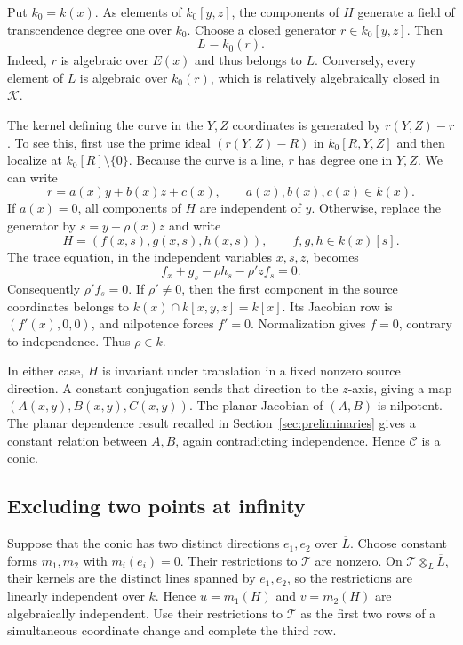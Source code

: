 \documentclass[11pt,reqno]{amsart}
\theoremstyle{definition}
\theoremstyle{remark}
\numberwithin{equation}{section}
\begin{document}
Put $k_0=k(x)$. As elements of $k_0[y,z]$, the components of $H$ generate a field of transcendence degree one over $k_0$. Choose a closed generator $r\in k_0[y,z]$. Then
\begin{equation}\label{eq:line-field}
 L=k_0(r).
\end{equation}
Indeed, $r$ is algebraic over $E(x)$ and thus belongs to $L$. Conversely, every element of $L$ is algebraic over $k_0(r)$, which is relatively algebraically closed in $\mathcal K$.

The kernel defining the curve in the $Y,Z$ coordinates is generated by $r(Y,Z)-r$. To see this, first use the prime ideal $(r(Y,Z)-R)$ in $k_0[R,Y,Z]$ and then localize at $k_0[R]\setminus\{0\}$. Because the curve is a line, $r$ has degree one in $Y,Z$. We can write
\[
 r=a(x)y+b(x)z+c(x),\qquad a(x),b(x),c(x)\in k(x).
\]
If $a(x)=0$, all components of $H$ are independent of $y$. Otherwise, replace the generator by $s=y-\rho(x)z$ and write
\[
 H=(f(x,s),g(x,s),h(x,s)),\qquad f,g,h\in k(x)[s].
\]
The trace equation, in the independent variables $x,s,z$, becomes
\[
 f_x+g_s-\rho h_s-\rho' zf_s=0.
\]
Consequently $\rho'f_s=0$. If $\rho'\neq0$, then the first component in the source coordinates belongs to $k(x)\cap k[x,y,z]=k[x]$. Its Jacobian row is $(f'(x),0,0)$, and nilpotence forces $f'=0$. Normalization gives $f=0$, contrary to independence. Thus $\rho\in k$.

In either case, $H$ is invariant under translation in a fixed nonzero source direction. A constant conjugation sends that direction to the $z$-axis, giving a map $(A(x,y),B(x,y),C(x,y))$. The planar Jacobian of $(A,B)$ is nilpotent. The planar dependence result recalled in Section~\ref{sec:preliminaries} gives a constant relation between $A,B$, again contradicting independence. Hence $\mathcal C$ is a conic.

\subsection{Excluding two points at infinity}
Suppose that the conic has two distinct directions $e_1,e_2$ over $\overline L$. Choose constant forms $m_1,m_2$ with $m_i(e_i)=0$. Their restrictions to $\mathcal T$ are nonzero. On $\mathcal T\otimes_L\overline L$, their kernels are the distinct lines spanned by $e_1,e_2$, so the restrictions are linearly independent over $k$. Hence $u=m_1(H)$ and $v=m_2(H)$ are algebraically independent. Use their restrictions to $\mathcal T$ as the first two rows of a simultaneous coordinate change and complete the third row.
\end{document}
